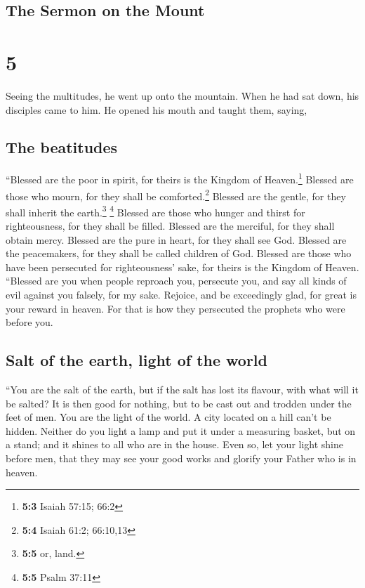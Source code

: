\hypertarget{the-sermon-on-the-mount}{%
\subsection{The Sermon on the Mount}\label{the-sermon-on-the-mount}}

\hypertarget{section-4}{%
\section{5}\label{section-4}}

 Seeing the multitudes, he went up onto the mountain. When
he had sat down, his disciples came to him.  He opened his
mouth and taught them, saying,

\hypertarget{the-beatitudes}{%
\subsection{The beatitudes}\label{the-beatitudes}}

 ``Blessed are the poor in spirit, for theirs is the
Kingdom of Heaven.\footnote{\textbf{5:3} Isaiah 57:15; 66:2}
 Blessed are those who mourn, for they shall be
comforted.\footnote{\textbf{5:4} Isaiah 61:2; 66:10,13} 
Blessed are the gentle, for they shall inherit the earth.\footnote{\textbf{5:5}
  or, land.} \footnote{\textbf{5:5} Psalm 37:11}  Blessed
are those who hunger and thirst for righteousness, for they shall be
filled.  Blessed are the merciful, for they shall obtain
mercy.  Blessed are the pure in heart, for they shall see
God.  Blessed are the peacemakers, for they shall be
called children of God.  Blessed are those who have been
persecuted for righteousness' sake, for theirs is the Kingdom of Heaven.
 ``Blessed are you when people reproach you, persecute
you, and say all kinds of evil against you falsely, for my sake.
 Rejoice, and be exceedingly glad, for great is your
reward in heaven. For that is how they persecuted the prophets who were
before you.

\hypertarget{salt-of-the-earth-light-of-the-world}{%
\subsection{Salt of the earth, light of the
world}\label{salt-of-the-earth-light-of-the-world}}

 ``You are the salt of the earth, but if the salt has
lost its flavour, with what will it be salted? It is then good for
nothing, but to be cast out and trodden under the feet of men.
 You are the light of the world. A city located on a hill
can't be hidden.  Neither do you light a lamp and put it
under a measuring basket, but on a stand; and it shines to all who are
in the house.  Even so, let your light shine before men,
that they may see your good works and glorify your Father who is in
heaven.

